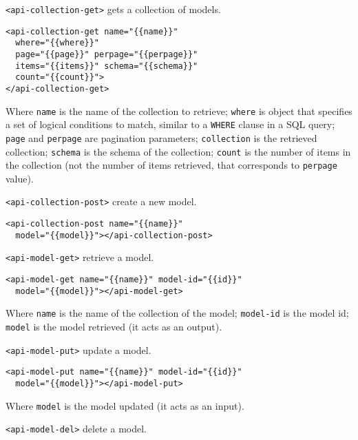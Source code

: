 \texttt{<api-collection-get>} gets a collection of models. 

\begin{lstlisting}[language=HTML5]
<api-collection-get name="{{name}}" 
  where="{{where}}" 
  page="{{page}}" perpage="{{perpage}}"  
  items="{{items}}" schema="{{schema}}"
  count="{{count}}">
</api-collection-get>
\end{lstlisting}

Where 
\texttt{name} is the name of the collection to retrieve; 
\texttt{where} is object that specifies a set of logical conditions to match, similar to a \texttt{WHERE} clause in a SQL query;
\texttt{page} and \texttt{perpage} are pagination parameters;
\texttt{collection} is the retrieved collection;
\texttt{schema} is the schema of the collection;
\texttt{count} is the number of items in the collection (not the number of items retrieved, that corresponds to \texttt{perpage} value).

\vspace{0.2cm}

\texttt{<api-collection-post>} create a new model. 

\begin{lstlisting}[language=HTML5]
<api-collection-post name="{{name}}" 
  model="{{model}}"></api-collection-post>
\end{lstlisting}

\texttt{<api-model-get>} retrieve a model. 

\begin{lstlisting}[language=HTML5]
<api-model-get name="{{name}}" model-id="{{id}}" 
  model="{{model}}"></api-model-get>
\end{lstlisting}

Where \texttt{name} is the name of the collection of the model; \texttt{model-id} is the model id; \texttt{model} is the model retrieved (it acts as an output).

\texttt{<api-model-put>} update a model. 

\begin{lstlisting}[language=HTML5]
<api-model-put name="{{name}}" model-id="{{id}}" 
  model="{{model}}"></api-model-put>
\end{lstlisting}

Where \texttt{model} is the model updated (it acts as an input).

\vspace{0.2cm}

\texttt{<api-model-del>} delete a model. 

